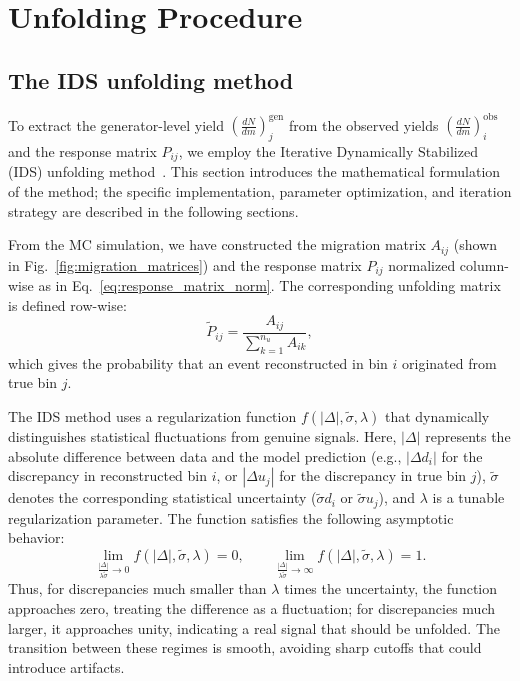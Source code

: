 \clearpage
\section{Unfolding Procedure}
\label{sec:unfolding_data}

\subsection{The IDS unfolding method}

To extract the generator-level yield $\left( \frac{dN}{dm}
    \right)_{j}^{\text{gen}}$ from the observed yields $\left( \frac{dN}{dm}
    \right)_{i}^{\text{obs}}$ and the response matrix $P_{ij}$, we employ the
Iterative Dynamically Stabilized (IDS) unfolding method~\cite{Malaescu2009}.
This section introduces the mathematical formulation of the method; the
specific implementation, parameter optimization, and iteration strategy are
described in the following sections.

From the MC simulation, we have constructed the migration matrix $A_{ij}$
(shown in Fig.~\ref{fig:migration_matrices}) and the response matrix $P_{ij}$
normalized column-wise as in Eq.~\eqref{eq:response_matrix_norm}. The
corresponding unfolding matrix is defined row-wise:
\begin{equation}
    \tilde{P}_{ij} = \frac{A_{ij}}{\sum_{k=1}^{n_u} A_{ik}},
    \label{eq:unfolding_matrix}
\end{equation}
which gives the probability that an event reconstructed in bin $i$ originated from true bin $j$.

The IDS method uses a regularization function $f\left(|\Delta|, \tilde{\sigma},
    \lambda\right)$ that dynamically distinguishes statistical fluctuations from
genuine signals. Here, $|\Delta|$ represents the absolute difference between
data and the model prediction (e.g., $|\Delta d_i|$ for the discrepancy in
reconstructed bin $i$, or $|\Delta u_j|$ for the discrepancy in true bin $j$),
$\tilde{\sigma}$ denotes the corresponding statistical uncertainty
($\tilde{\sigma} d_i$ or $\tilde{\sigma} u_j$), and $\lambda$ is a tunable
regularization parameter. The function satisfies the following asymptotic
behavior:
\begin{equation}
    \lim_{\frac{|\Delta|}{\lambda \tilde{\sigma}} \to 0} f(|\Delta|, \tilde{\sigma}, \lambda) = 0, \qquad
    \lim_{\frac{|\Delta|}{\lambda \tilde{\sigma}} \to \infty} f(|\Delta|, \tilde{\sigma}, \lambda) = 1.
    \label{eq:reg_function_limits}
\end{equation}
Thus, for discrepancies much smaller than $\lambda$ times the uncertainty, the function approaches zero, treating the difference as a fluctuation; for discrepancies much larger, it approaches unity, indicating a real signal that should be unfolded. The transition between these regimes is smooth, avoiding sharp cutoffs that could introduce artifacts.

